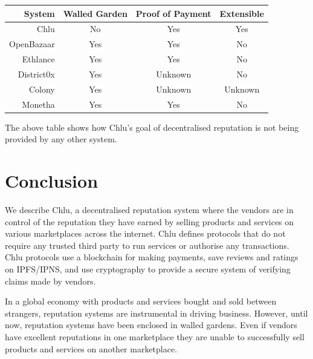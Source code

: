 \documentclass[a4paper]{article}
\begin{document}
\begin{center}
\begin{tabular}{ | r | c | c | c | }
  \hline
  System & Walled Garden & Proof of Payment & Extensible \\
  \hline

  Chlu & No & Yes & Yes \\

  \hline

  OpenBazaar\cite{openbazaar} & Yes & Yes & No \\

  \hline

  Ethlance\cite{ethlance} & Yes & Yes & No \\

  \hline

  District0x\cite{district0x} & Yes & Unknown & No \\

  \hline

  Colony\cite{colony} & Yes & Unknown & Unknown \\

  \hline

  Monetha\cite{monetha} & Yes & Yes & No \\

  \hline
\end{tabular}
\end{center}

The above table shows how Chlu's goal of decentralised reputation is
not being provided by any other system.

\section{Conclusion}

We describe Chlu, a decentralised reputation system where the vendors
are in control of the reputation they have earned by selling products
and services on various marketplaces across the internet. Chlu defines
protocols that do not require any trusted third party to run services
or authorise any transactions. Chlu protocols use a blockchain for
making payments, save reviews and ratings on IPFS/IPNS, and use
cryptography to provide a secure system of verifying claims made by
vendors.

In a global economy with products and services bought and sold between
strangers, reputation systems are instrumental in driving
business. However, until now, reputation systems have been enclosed in
walled gardens. Even if vendors have excellent reputations in one
marketplace they are unable to successfully sell products and services
on another marketplace.
\end{document}
